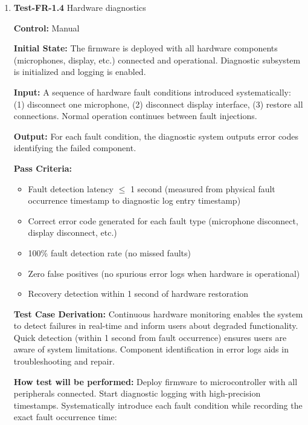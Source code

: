 \documentclass[12pt, titlepage]{article}
\begin{document}
\begin{enumerate}
\item{\textbf{Test-FR-1.4} Hardware diagnostics\\}

\textbf{Control:} Manual
					
\textbf{Initial State:} 
The firmware is deployed with all hardware components (microphones, display,
etc.) connected and operational. Diagnostic subsystem is initialized and logging
is enabled.
					
\textbf{Input:}
A sequence of hardware fault conditions introduced systematically: (1)
disconnect one microphone, (2) disconnect display interface, (3) restore all
connections. Normal operation continues between fault injections.
					
\textbf{Output:}
For each fault condition, the diagnostic system outputs error codes 
identifying the failed component.

\textbf{Pass Criteria:}
\begin{itemize}
\item Fault detection latency $\leq$ 1 second (measured from physical fault
occurrence timestamp to diagnostic log entry timestamp)
\item Correct error code generated for each fault type (microphone disconnect,
display disconnect, etc.)
\item 100\% fault detection rate (no missed faults)
\item Zero false positives (no spurious error logs when hardware is operational)
\item Recovery detection within 1 second of hardware restoration
\end{itemize}

\textbf{Test Case Derivation:} 
Continuous hardware monitoring enables the system to detect failures in
real-time and inform users about degraded functionality. Quick detection (within
1 second from fault occurrence) ensures users are aware of system limitations.
Component identification in error logs aids in troubleshooting and repair.
					
\textbf{How test will be performed:}
Deploy firmware to microcontroller with all peripherals connected. Start
diagnostic logging with high-precision timestamps. Systematically introduce each
fault condition while recording the exact fault occurrence time:


\end{enumerate}
\end{document}
